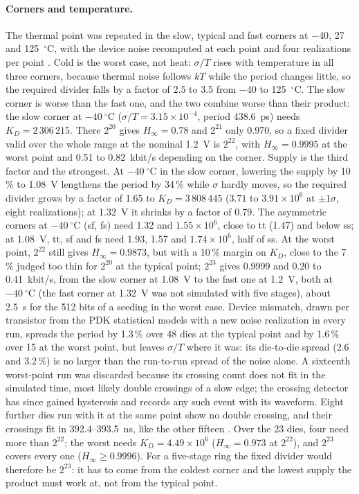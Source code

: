 \paragraph{Corners and temperature.} The thermal point was repeated in the
slow, typical and fast corners at $-40$, 27 and 125~$^\circ$C, with the
device noise recomputed at each point and four realizations per point
\simu{}. Cold is the worst case, not heat: $\sigma/T$ rises with
temperature in all three corners, because thermal noise follows $kT$
while the period changes little, so the required divider falls by a
factor of 2.5 to 3.5 from $-40$ to 125~$^\circ$C. The slow corner is worse
than the fast one, and the two combine worse than their product: the
slow corner at $-40~^\circ$C ($\sigma/T = 3.15\times10^{-4}$, period
438.6~ps) needs $K_D = 2\,306\,215$. There $2^{20}$ gives
$H_\infty = 0.78$ and $2^{21}$ only 0.970, so a fixed divider valid over
the whole range at the nominal 1.2~V is $2^{22}$, with
$H_\infty = 0.9995$ at the worst point and 0.51 to 0.82~kbit/s depending
on the corner. Supply is the third factor and the strongest. At
$-40~^\circ$C in the slow corner, lowering the supply by 10\,\% to
1.08~V lengthens the period by 34\,\% while $\sigma$ hardly moves, so
the required divider grows by a factor of 1.65 to $K_D = 3\,808\,445$
($3.71$ to $3.91\times10^6$ at $\pm1\sigma$, eight realizations); at
1.32~V it shrinks by a factor of 0.79. The asymmetric corners at
$-40~^\circ$C (sf, fs) need 1.32 and $1.55\times10^6$, close to tt (1.47)
and below ss; at 1.08~V, tt, sf and fs need 1.93, 1.57 and
$1.74\times10^6$, half of ss. At the worst point, $2^{22}$ still gives
$H_\infty = 0.9873$, but with a 10\,\% margin on $K_D$, close to the
7\,\% judged too thin for $2^{20}$ at the typical point; $2^{23}$ gives
0.9999 and 0.20 to 0.41~kbit/s, from the slow corner at 1.08~V to the
fast one at 1.2~V, both at $-40~^\circ$C (the fast corner at 1.32~V was
not simulated with five stages), about 2.5~s for the
512 bits of a seeding in the worst case. Device mismatch, drawn per
transistor from the \ac{PDK} statistical models with a new noise
realization in every run, spreads the period by 1.3\,\% over 48 dies at
the typical point and by 1.6\,\% over 15 at the worst point, but leaves
$\sigma/T$ where it was: its die-to-die spread (2.6 and 3.2\,\%) is no
larger than the run-to-run spread of the noise alone. A sixteenth
worst-point run was discarded because its crossing count does not fit in
the simulated time, most likely double crossings of a slow edge; the
crossing detector has since gained hysteresis and records any such event
with its waveform. Eight further dies run with it at the same point show
no double crossing, and their crossings fit in 392.4--393.5~ns, like the
other fifteen \simu{}. Over the 23 dies, four need more than $2^{22}$; the
worst needs $K_D = 4.49\times10^6$ ($H_\infty = 0.973$ at $2^{22}$), and
$2^{23}$ covers every one ($H_\infty \ge 0.9996$). For a five-stage ring
the fixed divider would therefore be $2^{23}$: it has to come from the
coldest corner and the lowest supply the product must work at, not from
the typical point.

